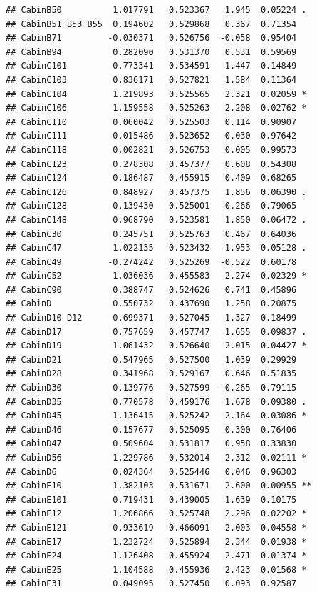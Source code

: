 \documentclass[]{article}
\begin{document}
\begin{verbatim}
## CabinB50          1.017791   0.523367   1.945  0.05224 .  
## CabinB51 B53 B55  0.194602   0.529868   0.367  0.71354    
## CabinB71         -0.030371   0.526756  -0.058  0.95404    
## CabinB94          0.282090   0.531370   0.531  0.59569    
## CabinC101         0.773341   0.534591   1.447  0.14849    
## CabinC103         0.836171   0.527821   1.584  0.11364    
## CabinC104         1.219893   0.525565   2.321  0.02059 *  
## CabinC106         1.159558   0.525263   2.208  0.02762 *  
## CabinC110         0.060042   0.525503   0.114  0.90907    
## CabinC111         0.015486   0.523652   0.030  0.97642    
## CabinC118         0.002821   0.526753   0.005  0.99573    
## CabinC123         0.278308   0.457377   0.608  0.54308    
## CabinC124         0.186487   0.455915   0.409  0.68265    
## CabinC126         0.848927   0.457375   1.856  0.06390 .  
## CabinC128         0.139430   0.525001   0.266  0.79065    
## CabinC148         0.968790   0.523581   1.850  0.06472 .  
## CabinC30          0.245751   0.525763   0.467  0.64036    
## CabinC47          1.022135   0.523432   1.953  0.05128 .  
## CabinC49         -0.274242   0.525269  -0.522  0.60178    
## CabinC52          1.036036   0.455583   2.274  0.02329 *  
## CabinC90          0.388747   0.524626   0.741  0.45896    
## CabinD            0.550732   0.437690   1.258  0.20875    
## CabinD10 D12      0.699371   0.527045   1.327  0.18499    
## CabinD17          0.757659   0.457747   1.655  0.09837 .  
## CabinD19          1.061432   0.526640   2.015  0.04427 *  
## CabinD21          0.547965   0.527500   1.039  0.29929    
## CabinD28          0.341968   0.529167   0.646  0.51835    
## CabinD30         -0.139776   0.527599  -0.265  0.79115    
## CabinD35          0.770578   0.459176   1.678  0.09380 .  
## CabinD45          1.136415   0.525242   2.164  0.03086 *  
## CabinD46          0.157677   0.525095   0.300  0.76406    
## CabinD47          0.509604   0.531817   0.958  0.33830    
## CabinD56          1.229786   0.532014   2.312  0.02111 *  
## CabinD6           0.024364   0.525446   0.046  0.96303    
## CabinE10          1.382103   0.531671   2.600  0.00955 ** 
## CabinE101         0.719431   0.439005   1.639  0.10175    
## CabinE12          1.206866   0.525748   2.296  0.02202 *  
## CabinE121         0.933619   0.466091   2.003  0.04558 *  
## CabinE17          1.232724   0.525894   2.344  0.01938 *  
## CabinE24          1.126408   0.455924   2.471  0.01374 *  
## CabinE25          1.104588   0.455936   2.423  0.01568 *  
## CabinE31          0.049095   0.527450   0.093  0.92587    

\end{verbatim}
\end{document}
